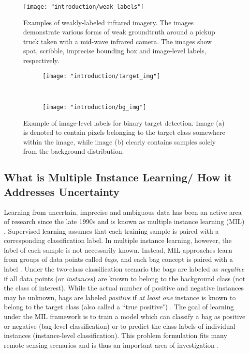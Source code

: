 \begin{center}
	\begin{figure*}[h]
		\centering
		\texttt{[image: "introduction/weak\_labels"]}
		\caption{Examples of weakly-labeled infrared imagery.  The images demonstrate various forms of weak groundtruth around a pickup truck taken with a mid-wave infrared camera.  The images show spot, scribble, imprecise bounding box and image-level labels, respectively.}
		\label{fig:weak_labels}
	\end{figure*}
\end{center}

\begin{figure*}[t!]
	\centering
	\begin{subfigure}[t]{0.5\textwidth}
		\centering
		\texttt{[image: "introduction/target\_img"]}
		\caption{}
	\end{subfigure}%
	~ 
	\begin{subfigure}[t]{0.5\textwidth}
		\centering
		\texttt{[image: "introduction/bg\_img"]}
		\caption{}
	\end{subfigure}
	\caption{Example of image-level labels for binary target detection.  Image (a) is denoted to contain pixels belonging to the target class somewhere within the image, while image (b) clearly contains samples solely from the background distribution.}
	\label{fig:binary_targets}%
\end{figure*}

\subsection{What is Multiple Instance Learning/ How it Addresses Uncertainty}
Learning from uncertain, imprecise and ambiguous data has been an active area of research since the late 1990s and is known as multiple instance learning (MIL) \cite{Bocinsky2019Thesis}.  Supervised learning assumes that each training sample is paired with a corresponding classification label.  In multiple instance learning, however, the label of each sample is not necessarily known.  Instead, MIL approaches learn from groups of data points called \textit{bags}, and each bag concept is paired with a label \cite{Cook2015Thesis}. Under the two-class classification scenario the bags are labeled as \textit{negative} if all data points (or \textit{instances}) are known to belong to the background class (not the class of interest).  While the actual number of positive and negative instances may be unknown, bags are labeled \textit{positive} if \textit{at least one} instance is known to belong to the target class (also called a ``true positive") \cite{Zare2016MIACE}.  The goal of learning under the MIL framework is to train a model which can classify a bag as positive or negative (bag-level classification) or to predict the class labels of individual instances (instance-level classification). This problem formulation fits many remote sensing scenarios and is thus an important area of investigation \cite{Du2017Thesis}.  

